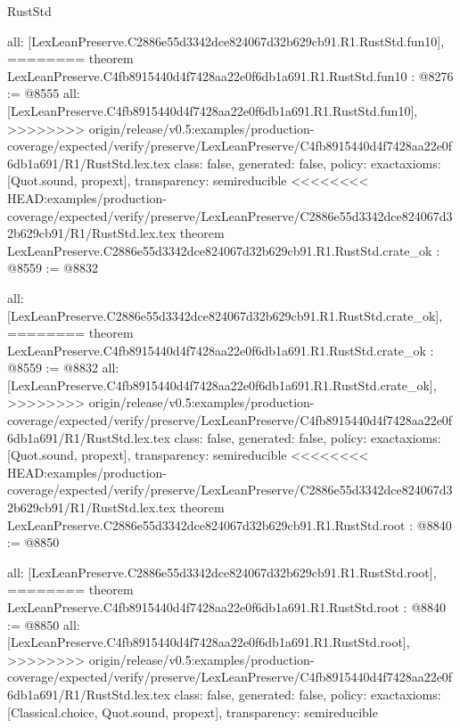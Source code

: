 \begin{lexlean}{RustStd}
\begin{coremodule}
{\begin{coremodule}
{{{{{{{{{{{{{  all: [LexLeanPreserve.C2886e55d3342dce824067d32b629cb91.R1.RustStd.fun10],
========
theorem LexLeanPreserve.C4fb8915440d4f7428aa22e0f6db1a691.R1.RustStd.fun10 : @8276 := @8555 {
  all: [LexLeanPreserve.C4fb8915440d4f7428aa22e0f6db1a691.R1.RustStd.fun10],
>>>>>>>> origin/release/v0.5:examples/production-coverage/expected/verify/preserve/LexLeanPreserve/C4fb8915440d4f7428aa22e0f6db1a691/R1/RustStd.lex.tex
  class: false,
  generated: false,
  policy: exact{axioms: [Quot.sound, propext]},
  transparency: semireducible
}
<<<<<<<< HEAD:examples/production-coverage/expected/verify/preserve/LexLeanPreserve/C2886e55d3342dce824067d32b629cb91/R1/RustStd.lex.tex
theorem LexLeanPreserve.C2886e55d3342dce824067d32b629cb91.R1.RustStd.crate_ok : @8559 := @8832 {
  all: [LexLeanPreserve.C2886e55d3342dce824067d32b629cb91.R1.RustStd.crate_ok],
========
theorem LexLeanPreserve.C4fb8915440d4f7428aa22e0f6db1a691.R1.RustStd.crate_ok : @8559 := @8832 {
  all: [LexLeanPreserve.C4fb8915440d4f7428aa22e0f6db1a691.R1.RustStd.crate_ok],
>>>>>>>> origin/release/v0.5:examples/production-coverage/expected/verify/preserve/LexLeanPreserve/C4fb8915440d4f7428aa22e0f6db1a691/R1/RustStd.lex.tex
  class: false,
  generated: false,
  policy: exact{axioms: [Quot.sound, propext]},
  transparency: semireducible
}
<<<<<<<< HEAD:examples/production-coverage/expected/verify/preserve/LexLeanPreserve/C2886e55d3342dce824067d32b629cb91/R1/RustStd.lex.tex
theorem LexLeanPreserve.C2886e55d3342dce824067d32b629cb91.R1.RustStd.root : @8840 := @8850 {
  all: [LexLeanPreserve.C2886e55d3342dce824067d32b629cb91.R1.RustStd.root],
========
theorem LexLeanPreserve.C4fb8915440d4f7428aa22e0f6db1a691.R1.RustStd.root : @8840 := @8850 {
  all: [LexLeanPreserve.C4fb8915440d4f7428aa22e0f6db1a691.R1.RustStd.root],
>>>>>>>> origin/release/v0.5:examples/production-coverage/expected/verify/preserve/LexLeanPreserve/C4fb8915440d4f7428aa22e0f6db1a691/R1/RustStd.lex.tex
  class: false,
  generated: false,
  policy: exact{axioms: [Classical.choice, Quot.sound, propext]},
  transparency: semireducible
}

}}}}}}}}}}}}}}}
\end{coremodule}}
\end{coremodule}
\end{lexlean}
